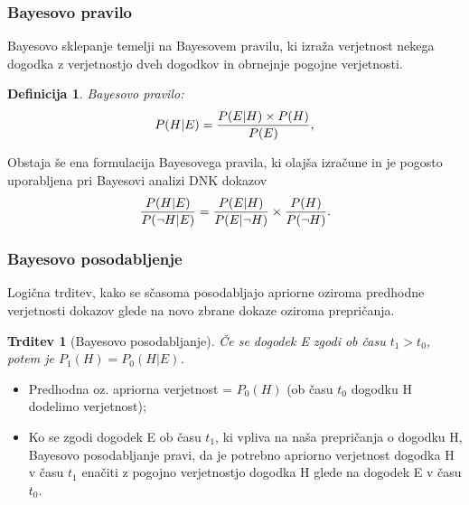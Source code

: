 \documentclass{beamer}
\newtheorem{definicija}{Definicija}
\newtheorem{trditev}{Trditev}
\begin{document}
\begin{frame}
    \frametitle{Bayesovo pravilo}
    Bayesovo sklepanje temelji na Bayesovem pravilu, ki izraža verjetnost nekega dogodka z verjetnostjo dveh dogodkov in obrnejnje pogojne
    verjetnosti. \vspace{3mm}
    \begin{definicija}
        Bayesovo pravilo:
        \[
            P(H \lvert E) = \frac{P(E \lvert H) \times P(H)}{P(E)}, \vspace{2mm}
        \] 
    \end{definicija} \vspace{3mm}
    Obstaja še ena formulacija Bayesovega pravila, ki olajša izračune in je pogosto uporabljena pri Bayesovi analizi DNK dokazov
    \[
        \frac{P(H \lvert E)}{P(\neg H \lvert E)} = \frac{P(E \lvert H)}{P(E \lvert \neg H)} \times \frac{P(H)}{P(\neg H)}. \vspace{2mm}
    \]
\end{frame}

\begin{frame}
    \frametitle{Bayesovo posodabljenje}
    Logična trditev, kako se sčasoma posodabljajo apriorne oziroma predhodne verjetnosti dokazov glede na novo zbrane dokaze oziroma prepričanja. \vspace{3mm}
    \begin{trditev}[Bayesovo posodabljanje]
        Če se dogodek E zgodi ob času $t_1 > t_0$, potem je $P_1(H) = P_0(H \lvert E)$.
    \end{trditev}
    \begin{itemize}
        \item Predhodna oz. apriorna verjetnost = $P_0(H)$ (ob času $t_0$ dogodku H dodelimo verjetnost);
        \item Ko se zgodi dogodek E ob času $t_1$, ki vpliva na naša prepričanja o dogodku H, Bayesovo posodabljanje pravi, da je potrebno apriorno 
        verjetnost dogodka H v času $t_1$ enačiti z pogojno verjetnostjo dogodka H glede na dogodek E v času $t_0$. 
    \end{itemize}
\end{frame}
\end{document}
